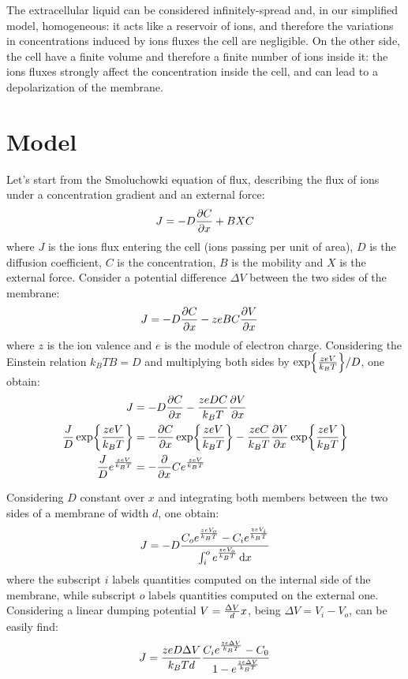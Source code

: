 \documentclass[11pt,a4 paper]{article}
\let\oldfrac\frac
\renewcommand{\frac}[3][d]{\ifthenelse{\equal{#1}{d}}{\oldfrac{#2}{#3}}{\nicefrac{#2}{#3}}}
\begin{document}
The extracellular liquid can be considered infinitely-spread and, in our simplified model, homogeneous: it acts like a reservoir of ions, and therefore the variations in concentrations induced by ions fluxes the cell are negligible. On the other side, the cell have a finite volume and therefore a finite number of ions inside it: the ions fluxes strongly affect the concentration inside the cell, and can lead to a depolarization of the membrane.

\section{Model}
Let's start from the Smoluchowki equation of flux, describing the flux of ions under a concentration gradient and an external force:
\begin{gather*}
    J = - D \pdv{C}{x} + BXC
\end{gather*}
where $J$ is the ions flux entering the cell (ions passing per unit of area), $D$ is the diffusion coefficient, $C$ is the concentration, $B$ is the mobility and $X$ is the external force. Consider a potential difference $\Delta V$ between the two sides of the membrane:
\begin{align*}
    J &= - D \pdv{C}{x} - zeBC\pdv{V}{x}
\end{align*}
where $z$ is the ion valence and $e$ is the module of electron charge. Considering the Einstein relation $k_BTB = D$ and multiplying both sides by $\exp{\frac{zeV}{k_BT}} / D$, one obtain:
\begin{align*}
    J &= - D \pdv{C}{x} - \frac{zeDC}{k_BT}\pdv{V}{x} \\
    \frac{J}{D} \exp{\frac{zeV}{k_BT}} &= - \pdv{C}{x} \exp{\frac{zeV}{k_BT}} - \frac{zeC}{k_BT}\pdv{V}{x} \exp{\frac{zeV}{k_BT}} \\
    \frac{J}{D}  e^{\frac{zeV}{k_BT}} &= - \pdv{x} C e^{\frac{zeV}{k_BT}}
\end{align*}

Considering $D$ constant over $x$ and integrating both members between the two sides of a membrane of width $d$, one obtain:
\begin{align*}
    J = - D \frac{C_oe^{\frac{zeV_o}{k_BT}} - C_ie^{\frac{zeV_i}{k_BT} }}{ \int_i^o e^{\frac{zeV_o}{k_BT}} \dd{x}}
\end{align*}
where the subscript $i$ labels quantities computed on the internal side of the membrane, while subscript $o$ labels quantities computed on the external one. Considering a linear dumping potential $V = \frac{\Delta V}{d} x$, being $\Delta V = V_i - V_o$, can be easily find:
\begin{align*}
    J = \frac{zeD\Delta V}{k_BTd} \frac{C_ie^{\frac{ze\Delta V}{k_BT} } - C_0 }{1 - e^{\frac{ze\Delta V}{k_BT} }}
\end{align*}
\end{document}
